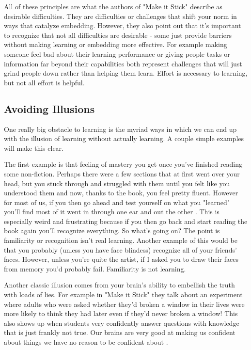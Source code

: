 \documentclass[11pt,a5paper]{book}
\begin{document}
All of these principles are what the authors of "Make it Stick" \cite{stick} describe as desirable difficulties. They are difficulties or challenges that shift your norm in ways that catalyze embedding. However, they also point out that it's important to recognize that not all difficulties are desirable - some just provide barriers without making learning or embedding more effective. For example making someone feel bad about their learning performance or giving people tasks or information far beyond their capabilities both represent challenges that will just grind people down rather than helping them learn. Effort is necessary to learning, but not all effort is helpful.

\subsection{Avoiding Illusions}
One really big obstacle to learning is the myriad ways in which we can end up with the illusion of learning without actually learning. A couple simple examples will make this clear.
\newline

The first example is that feeling of mastery you get once you've finished reading some non-fiction. Perhaps there were a few sections that at first went over your head, but you stuck through and struggled with them until you felt like you understood them and now, thanks to the book, you feel pretty fluent. However for most of us, if you then go ahead and test yourself on what you "learned" you'll find most of it went in through one ear and out the other \cite{stick}. This is especially weird and frustrating because if you then go back and start reading the book again you'll recognize everything. So what's going on? The point is familiarity or recognition isn't real learning. Another example of this would be that you probably (unless you have face blindess) recognize all of your friends' faces. However, unless you're quite the artist, if I asked you to draw their faces from memory you'd probably fail. Familiarity is not learning.
\newline

Another classic illusion comes from your brain's ability to embellish the truth with loads of lies. For example in "Make it Stick" they talk about an experiment where adults who were asked whether they'd broken a window in their lives were more likely to think they had later even if they'd never broken a window! This also shows up when students very confidently answer questions with knowledge that is just frankly not true. Our brains are very good at making us confident about things we have no reason to be confident about \cite{stick}. 
\newline
\end{document}
